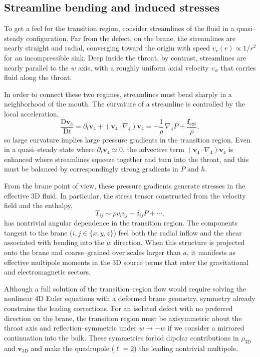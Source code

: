\documentclass[12pt]{article}
\begin{document}
\subsection{Streamline bending and induced stresses}
\label{subsec:streamline_bending}

To get a feel for the transition region, consider streamlines of the fluid
in a quasi--steady configuration.  Far from the defect, on the brane, the
streamlines are nearly straight and radial, converging toward the origin
with speed $v_r(r)\propto 1/r^2$ for an incompressible sink.  Deep inside
the throat, by contrast, streamlines are nearly parallel to the $w$ axis,
with a roughly uniform axial velocity $v_w$ that carries fluid along the
throat.

In order to connect these two regimes, streamlines must bend sharply in a
neighborhood of the mouth.  The curvature of a streamline is controlled by
the local acceleration,
\begin{equation}
  \frac{\mathrm{D}\mathbf{v}_4}{\mathrm{D}t}
  = \partial_t \mathbf{v}_4
    + (\mathbf{v}_4\cdot\nabla_4)\mathbf{v}_4
  = -\frac{1}{\rho}\,\nabla_4 P
    + \frac{\mathbf{f}_{\mathrm{ext}}}{\rho},
\end{equation}
so large curvature implies large pressure gradients in the transition
region.  Even in a quasi--steady state where $\partial_t\mathbf{v}_4\simeq 0$,
the advective term $(\mathbf{v}_4\cdot\nabla_4)\mathbf{v}_4$ is enhanced
where streamlines squeeze together and turn into the throat, and this must
be balanced by correspondingly strong gradients in $P$ and $h$.

From the brane point of view, these pressure gradients generate stresses in
the effective 3D fluid.  In particular, the stress tensor constructed from
the velocity field and the enthalpy,
\begin{equation}
  T_{ij}
  \sim \rho v_i v_j + \delta_{ij} P + \cdots,
\end{equation}
has nontrivial angular dependence in the transition region.  The components
tangent to the brane ($i,j\in\{x,y,z\}$) feel both the radial inflow and the
shear associated with bending into the $w$ direction.  When this structure
is projected onto the brane and coarse--grained over scales larger than $a$,
it manifests as effective multipole moments in the 3D source terms that
enter the gravitational and electromagnetic sectors.

Although a full solution of the transition--region flow would require
solving the nonlinear 4D Euler equations with a deformed brane geometry,
symmetry already constrains the leading corrections.  For an isolated
defect with no preferred direction on the brane, the transition region must
be axisymmetric about the throat axis and reflection--symmetric under
$w\to -w$ if we consider a mirrored continuation into the bulk.  These
symmetries forbid dipolar contributions in $\rho_{\mathrm{3D}}$ and
$\mathbf{v}_{\mathrm{3D}}$ and make the quadrupole ($\ell=2$) the leading
nontrivial multipole.
\end{document}
